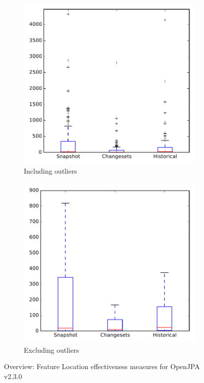 
\begin{figure}
    \centering
    \begin{subfigure}{.4\textwidth}
        \centering
        \includegraphics[height=0.4\textheight]{figures/flt/all_openjpa}
        \caption{Including outliers}\label{fig:flt:all:openjpa_outlier}
    \end{subfigure}%
    \begin{subfigure}{.4\textwidth}
        \centering
        \includegraphics[height=0.4\textheight]{figures/flt/all_openjpa_no_outlier}
        \caption{Excluding outliers}\label{fig:flt:all:openjpa_no_outlier}
    \end{subfigure}
\caption{Overview: Feature Location effectiveness measures for OpenJPA v2.3.0}
\label{fig:flt:all:openjpa}
\end{figure}
